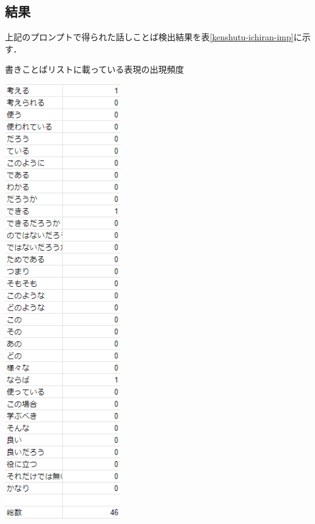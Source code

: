 

\subsection{結果}
上記のプロンプトで得られた話しことば検出結果を表\ref{kenshutu-ichiran-imp}に示す．



\begin{table}[H]
	\centering
        \caption{書きことばリストに載っている表現の出現頻度}
 	\includegraphics[width=50mm]{image/kenshutu-ichiran-imp.png}
	\label{kenshutu-ichiran-imp}
\end{table}

